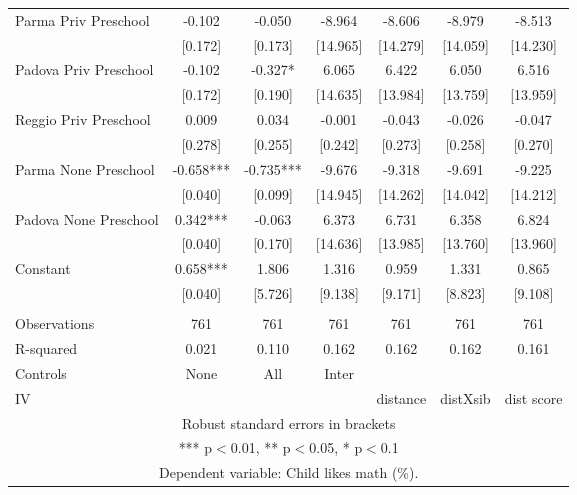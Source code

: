 \begin{tabular}{lcccccc}
Parma Priv Preschool & -0.102 & -0.050 & -8.964 & -8.606 & -8.979 & -8.513 \\
 & [0.172] & [0.173] & [14.965] & [14.279] & [14.059] & [14.230] \\
Padova Priv Preschool & -0.102 & -0.327* & 6.065 & 6.422 & 6.050 & 6.516 \\
 & [0.172] & [0.190] & [14.635] & [13.984] & [13.759] & [13.959] \\
Reggio Priv Preschool & 0.009 & 0.034 & -0.001 & -0.043 & -0.026 & -0.047 \\
 & [0.278] & [0.255] & [0.242] & [0.273] & [0.258] & [0.270] \\
Parma None Preschool & -0.658*** & -0.735*** & -9.676 & -9.318 & -9.691 & -9.225 \\
 & [0.040] & [0.099] & [14.945] & [14.262] & [14.042] & [14.212] \\
Padova None Preschool & 0.342*** & -0.063 & 6.373 & 6.731 & 6.358 & 6.824 \\
 & [0.040] & [0.170] & [14.636] & [13.985] & [13.760] & [13.960] \\
Constant & 0.658*** & 1.806 & 1.316 & 0.959 & 1.331 & 0.865 \\
 & [0.040] & [5.726] & [9.138] & [9.171] & [8.823] & [9.108] \\
 &  &  &  &  &  &  \\
Observations & 761 & 761 & 761 & 761 & 761 & 761 \\
R-squared & 0.021 & 0.110 & 0.162 & 0.162 & 0.162 & 0.161 \\
Controls & None & All & Inter &  &  &  \\
 IV &  &  &  & distance & distXsib & dist score \\ \hline
\multicolumn{7}{c}{ Robust standard errors in brackets} \\
\multicolumn{7}{c}{ *** p$<$0.01, ** p$<$0.05, * p$<$0.1} \\
\multicolumn{7}{c}{ Dependent variable: Child likes math (\%).} \\
\end{tabular}
